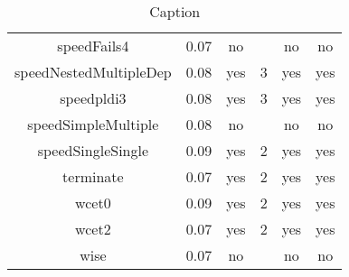 \begin{center}
\begin{table}[]
\begin{tabular}{c|c|c|c|c|c}
{} \\\hline
{speedFails4} & {0.07} & {no} & {} & {no} & {no
} \\\hline
{speedNestedMultipleDep} & {0.08} & {yes} & {3} & {yes} & {yes
} \\\hline
{speedpldi3} & {0.08} & {yes} & {3} & {yes} & {yes
} \\\hline
{speedSimpleMultiple} & {0.08} & {no} & {} & {no} & {no
} \\\hline
{speedSingleSingle} & {0.09} & {yes} & {2} & {yes} & {yes
} \\\hline
{terminate} & {0.07} & {yes} & {2} & {yes} & {yes
} \\\hline
{wcet0} & {0.09} & {yes} & {2} & {yes} & {yes
} \\\hline
{wcet2} & {0.07} & {yes} & {2} & {yes} & {yes
} \\\hline
{wise} & {0.07} & {no} & {} & {no} & {no} \\\hline 
    \end{tabular}
    \caption{Caption}
    \label{tab:my_label}
\end{table}
\end{center}


